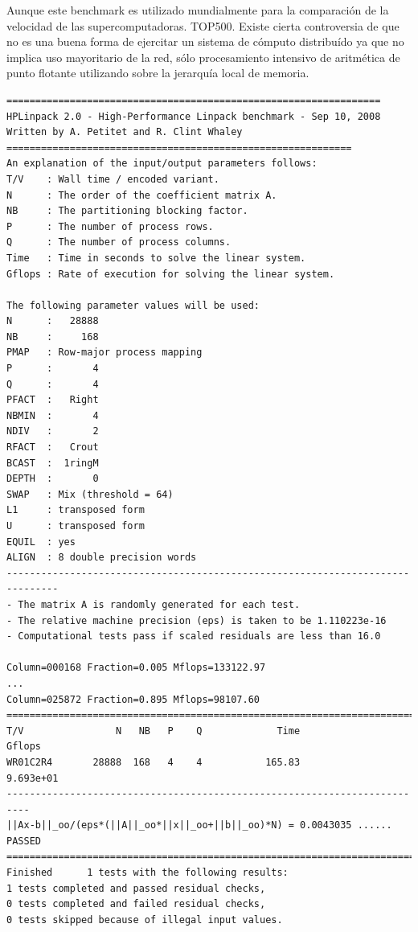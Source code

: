\documentclass[a4paper]{report}
\begin{document}
\bigskip

Aunque este benchmark es utilizado mundialmente para la comparaci\'on de la
velocidad de las supercomputadoras. TOP500. Existe cierta controversia de que
no es una buena forma de ejercitar un sistema de c\'omputo distribu\'ido ya
que no implica uso mayoritario de la red, s\'olo procesamiento intensivo de
aritm\'etica de punto flotante utilizando sobre la jerarqu\'ia local de
memoria.

\begin{verbatim}
=================================================================
HPLinpack 2.0 - High-Performance Linpack benchmark - Sep 10, 2008
Written by A. Petitet and R. Clint Whaley
============================================================
An explanation of the input/output parameters follows:
T/V    : Wall time / encoded variant.
N      : The order of the coefficient matrix A.
NB     : The partitioning blocking factor.
P      : The number of process rows.
Q      : The number of process columns.
Time   : Time in seconds to solve the linear system.
Gflops : Rate of execution for solving the linear system.

The following parameter values will be used:
N      :   28888
NB     :     168
PMAP   : Row-major process mapping
P      :       4
Q      :       4
PFACT  :   Right
NBMIN  :       4
NDIV   :       2
RFACT  :   Crout
BCAST  :  1ringM
DEPTH  :       0
SWAP   : Mix (threshold = 64)
L1     : transposed form
U      : transposed form
EQUIL  : yes
ALIGN  : 8 double precision words
-------------------------------------------------------------------------------
- The matrix A is randomly generated for each test.
- The relative machine precision (eps) is taken to be 1.110223e-16
- Computational tests pass if scaled residuals are less than 16.0

Column=000168 Fraction=0.005 Mflops=133122.97
...
Column=025872 Fraction=0.895 Mflops=98107.60
==========================================================================
T/V                N   NB   P    Q             Time                 Gflops
WR01C2R4       28888  168   4    4           165.83              9.693e+01
--------------------------------------------------------------------------
||Ax-b||_oo/(eps*(||A||_oo*||x||_oo+||b||_oo)*N) = 0.0043035 ...... PASSED
==========================================================================
Finished      1 tests with the following results:
1 tests completed and passed residual checks,
0 tests completed and failed residual checks,
0 tests skipped because of illegal input values.
\end{verbatim}
\end{document}
